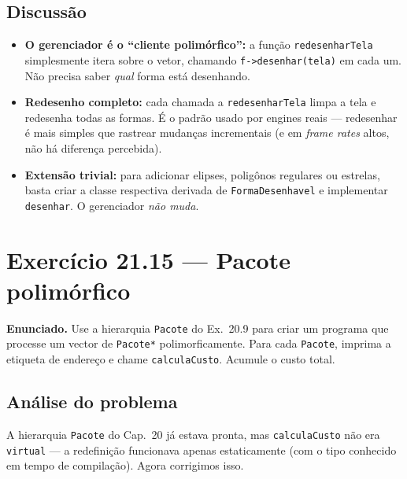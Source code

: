 \documentclass[11pt,a4paper]{article}
\begin{document}
\subsection*{Discuss\~ao}

\begin{itemize}[leftmargin=*]
  \item \textbf{O gerenciador \'e o ``cliente polim\'orfico'':} a fun\c{c}\~ao \texttt{redesenharTela} simplesmente itera sobre o vetor, chamando \texttt{f->desenhar(tela)} em cada um. N\~ao precisa saber \emph{qual} forma est\'a desenhando.
  \item \textbf{Redesenho completo:} cada chamada a \texttt{redesenharTela} limpa a tela e redesenha todas as formas. \'E o padr\~ao usado por engines reais --- redesenhar \'e mais simples que rastrear mudan\c{c}as incrementais (e em \emph{frame rates} altos, n\~ao h\'a diferen\c{c}a percebida).
  \item \textbf{Extens\~ao trivial:} para adicionar elipses, polig\^onos regulares ou estrelas, basta criar a classe respectiva derivada de \texttt{FormaDesenhavel} e implementar \texttt{desenhar}. O gerenciador \emph{n\~ao muda}.
\end{itemize}

\newpage
\section{Exerc\'icio 21.15 --- Pacote polim\'orfico}

\begin{enunciado}
\textbf{Enunciado.} Use a hierarquia \texttt{Pacote} do Ex.~20.9 para criar um programa que processe um vector de \texttt{Pacote*} polimorficamente. Para cada \texttt{Pacote}, imprima a etiqueta de endere\c{c}o e chame \texttt{calculaCusto}. Acumule o custo total.
\end{enunciado}

\subsection*{An\'alise do problema}

A hierarquia \texttt{Pacote} do Cap.~20 j\'a estava pronta, mas \texttt{calculaCusto} n\~ao era \texttt{virtual} --- a redefini\c{c}\~ao funcionava apenas estaticamente (com o tipo conhecido em tempo de compila\c{c}\~ao). Agora corrigimos isso.
\end{document}
